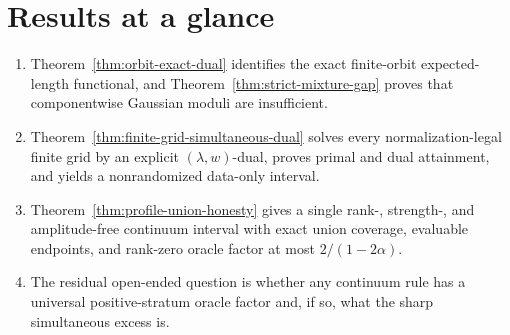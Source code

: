 \section{Results at a glance}
\begin{enumerate}
\item Theorem~\ref{thm:orbit-exact-dual} identifies the exact finite-orbit expected-length functional, and Theorem~\ref{thm:strict-mixture-gap} proves that componentwise Gaussian moduli are insufficient.
\item Theorem~\ref{thm:finite-grid-simultaneous-dual} solves every normalization-legal finite grid by an explicit \((\lambda,w)\)-dual, proves primal and dual attainment, and yields a nonrandomized data-only interval.
\item Theorem~\ref{thm:profile-union-honesty} gives a single rank-, strength-, and amplitude-free continuum interval with exact union coverage, evaluable endpoints, and rank-zero oracle factor at most \(2/(1-2\alpha)\).
\item The residual open-ended question is whether any continuum rule has a universal positive-stratum oracle factor and, if so, what the sharp simultaneous excess is.
\end{enumerate}